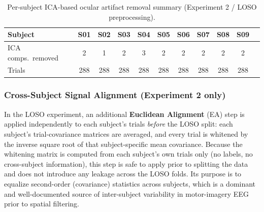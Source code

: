 \documentclass[11pt,a4paper]{article}
\begin{document}
\begin{table}[H]
\centering
\caption{Per-subject ICA-based ocular artifact removal summary (Experiment 2 / LOSO preprocessing).}
\label{tab:ica-removed}
\begin{tabular}{lcccccccccc}
\toprule
Subject & S01 & S02 & S03 & S04 & S05 & S06 & S07 & S08 & S09 \\
\midrule
ICA comps.\ removed & 2 & 1 & 2 & 3 & 2 & 2 & 2 & 2 & 2 \\
Trials & 288 & 288 & 288 & 288 & 288 & 288 & 288 & 288 & 288 \\
\bottomrule
\end{tabular}
\end{table}

\subsubsection{Cross-Subject Signal Alignment (Experiment 2 only)}
In the LOSO experiment, an additional \textbf{Euclidean Alignment} (EA) step \cite{he2020ea} is applied
independently to each subject's trials \emph{before} the LOSO split: each subject's trial-covariance
matrices are averaged, and every trial is whitened by the inverse square root of that subject-specific
mean covariance. Because the whitening matrix is computed from each subject's own trials only (no
labels, no cross-subject information), this step is safe to apply prior to splitting the data and does
not introduce any leakage across the LOSO folds. Its purpose is to equalize second-order (covariance)
statistics across subjects, which is a dominant and well-documented source of inter-subject variability
in motor-imagery EEG prior to spatial filtering.
\end{document}
